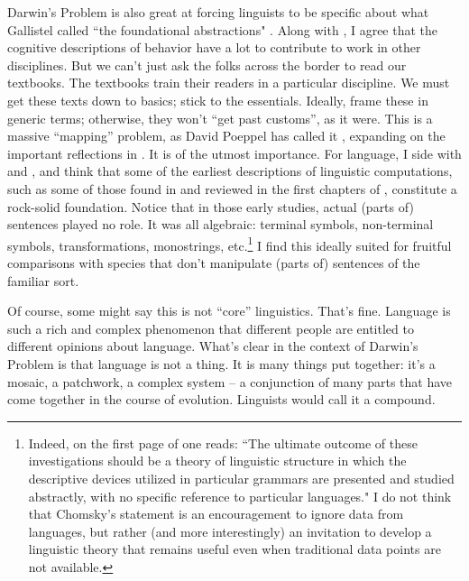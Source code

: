 Darwin's Problem is also great at forcing linguists to be specific about what Gallistel called ``the foundational abstractions" \citep{gallistel2009foundational}. Along with \cite{krakauer2017neuroscience}, I agree that the cognitive descriptions of behavior have a lot to contribute to work in other disciplines. But we can't just ask the folks across the border to read our textbooks. The textbooks train their readers in a particular discipline. We must get these texts down to basics; stick to the essentials. Ideally, frame these in generic terms; otherwise, they won't ``get past customs'', as it were. This is a massive ``mapping'' problem, as David Poeppel has called it \citep{poeppel2012maps}, expanding on the important reflections in \cite{poeppel2005defining}. It is of the utmost importance. For language, I side with \cite{fitch2014toward} and \cite{uriagereka2008syntactic}, and think that some of the earliest descriptions of linguistic computations, such as some of those found in \cite{Chomsky1957} and reviewed in the first chapters of \cite{lasnik2000syntactic}, constitute a rock-solid foundation. Notice that in those early studies, actual (parts of) sentences played no role. It was all algebraic: terminal symbols, non-terminal symbols, transformations, monostrings, etc.\footnote{Indeed, on the first page of \cite{Chomsky1957} one reads: ``The ultimate outcome of these investigations should be a theory of linguistic structure in which the descriptive devices utilized in particular grammars are presented and studied abstractly, with no specific reference to particular languages." I do not think that Chomsky's statement is an encouragement to ignore data from languages, but rather (and more interestingly) an invitation to develop a linguistic theory that remains useful even when traditional data points are not available.} I find this ideally suited for fruitful comparisons with species that don't manipulate (parts of) sentences of the familiar sort.

Of course, some might say this is not ``core'' linguistics. That's fine. Language is such a rich and complex phenomenon that different people are entitled to different opinions about language. What's clear in the context of Darwin's Problem is that language is not a thing. It is many things put together: it's a mosaic, a patchwork, a complex system -- a conjunction of many parts that have come together in the course of evolution. Linguists would call it a compound.

